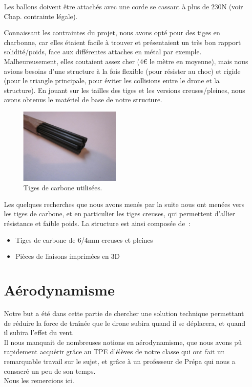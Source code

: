 \documentclass[a4paper,11pt]{article}
\begin{document}
Les ballons doivent être attachés avec une corde se cassant à plus de 230N (voir Chap. contrainte légale).

Connaissant les contraintes du projet, nous avons opté pour des tiges en charbonne, car elles étaient facile à trouver et présentaient un très bon rapport solidité/poids, face aux différentes attaches en métal par exemple. Malheureusement, elles coutaient assez cher (4€ le mètre en moyenne), mais nous avions besoins d'une structure à la fois flexible (pour résister au choc) et rigide (pour le triangle principale, pour éviter les collisions entre le drone et la structure). En jouant sur les tailles des tiges et les versions creuses/pleines, nous avons obtenus le matériel de base de notre structure.

\begin{figure}[H]
	\centering
	\includegraphics[width=5cm]{../Images/tige_carbone.JPG}
	\caption{Tiges de carbone utilisées.}
\end{figure}


Les quelques recherches que nous avons menés par la suite nous ont menées vers les tiges de carbone, et en particulier les tiges creuses, qui permettent d'allier résistance et faible poids.
La structure est ainsi composée de~:
\begin{itemize}
        \item Tiges de carbone de 6/4mm creuses et pleines
        \item Pièces de liaisons imprimées en 3D
\end{itemize}

\section{Aérodynamisme}
	Notre but a été dans cette partie de chercher une solution technique permettant de réduire la force de traînée que le drone subira quand il se déplacera, et quand il subira l'effet du vent. \\
	Il nous manquait de nombreuses notions en aérodynamisme, que nous avons pû rapidement acquérir grâce au TPE d'élèves de notre classe qui ont fait un remarquable travail sur le sujet, et grâce à un professeur de Prépa qui nous a consacré un peu de son temps.\\
	Nous les remercions ici.
\end{document}

